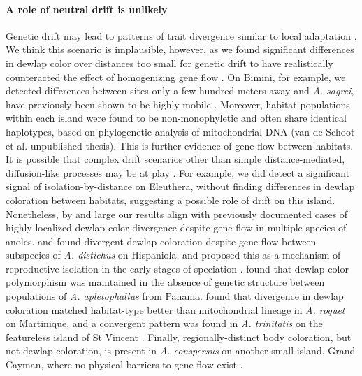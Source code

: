 \paragraph{A role of neutral drift is unlikely} Genetic drift may lead to patterns of trait divergence similar to local adaptation \citep{Miles2019}. We think this scenario is implausible, however, as we found significant differences in dewlap color over distances too small for genetic drift to have realistically counteracted the effect of homogenizing gene flow \citep{Richardson2014}. On Bimini, for example, we detected differences between sites only a few hundred meters away and \textit{A. sagrei}, have previously been shown to be highly mobile \citep{Kamath2018}. Moreover, habitat-populations within each island were found to be non-monophyletic and often share identical haplotypes, based on phylogenetic analysis of mitochondrial DNA (van de Schoot et al. unpublished thesis). This is further evidence of gene flow between habitats.\\

It is possible that complex drift scenarios other than simple distance-mediated, diffusion-like processes may be at play \citep{Miles2019}. For example,  we did detect a significant signal of isolation-by-distance on Eleuthera, without finding differences in dewlap coloration between habitats, suggesting a possible role of drift on this island. Nonetheless, by and large our results align with previously documented cases of highly localized  dewlap color divergence despite gene flow in multiple species of anoles. \citet{Ng2012} and \citet{Ng2016} found divergent dewlap coloration despite gene flow between subspecies of \textit{A. distichus} on Hispaniola, and proposed this as a mechanism of reproductive isolation in the early stages of speciation \citep{Ng2011, Lambert2013, Ng2017}. \citet{Stapley2011} found that dewlap color polymorphism was maintained in the absence of genetic structure between populations of \textit{A. apletophallus} from Panama. \citet{Thorpe2002a} found that divergence in dewlap coloration matched habitat-type better than mitochondrial lineage in \textit{A. roquet} on Martinique, and a convergent pattern was found in \textit{A. trinitatis} on the featureless island of St Vincent \citep{Thorpe2002b}. Finally, regionally-distinct body coloration, but not dewlap coloration, is present in \textit{A. conspersus} on another small island, Grand Cayman, where no physical barriers to gene flow exist \citep{Macedonia2001}.

